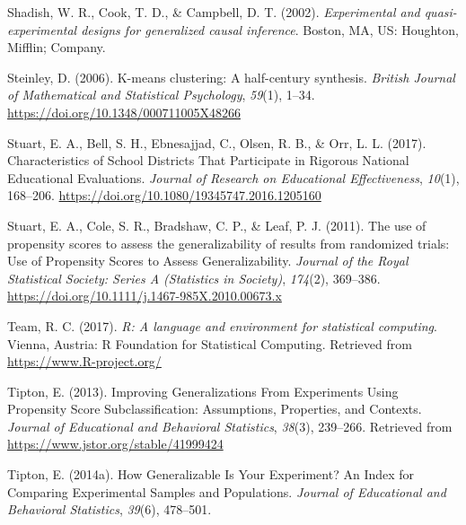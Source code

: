 \documentclass[
  man,floatsintext]{apa6}
\newlength{\cslhangindent}
\newlength{\cslentryspacingunit} %
\newenvironment{CSLReferences}[2] %
 {%
  \setlength{\parindent}{0pt}
  \ifodd #1
  \let\oldpar\par
  \def\par{\hangindent=\cslhangindent\oldpar}
  \fi
  \setlength{\parskip}{#2\cslentryspacingunit}
 }%
 {}
\begin{document}
\begin{CSLReferences}{1}{0}
\leavevmode{}%
Shadish, W. R., Cook, T. D., \& Campbell, D. T. (2002). \emph{Experimental and quasi-experimental designs for generalized causal inference}. Boston, MA, US: Houghton, Mifflin; Company.

\leavevmode{}%
Steinley, D. (2006). K-means clustering: {A} half-century synthesis. \emph{British Journal of Mathematical and Statistical Psychology}, \emph{59}(1), 1--34. \url{https://doi.org/10.1348/000711005X48266}

\leavevmode{}%
Stuart, E. A., Bell, S. H., Ebnesajjad, C., Olsen, R. B., \& Orr, L. L. (2017). Characteristics of {School Districts That Participate} in {Rigorous National Educational Evaluations}. \emph{Journal of Research on Educational Effectiveness}, \emph{10}(1), 168--206. \url{https://doi.org/10.1080/19345747.2016.1205160}

\leavevmode{}%
Stuart, E. A., Cole, S. R., Bradshaw, C. P., \& Leaf, P. J. (2011). The use of propensity scores to assess the generalizability of results from randomized trials: {Use} of {Propensity Scores} to {Assess Generalizability}. \emph{Journal of the Royal Statistical Society: Series A (Statistics in Society)}, \emph{174}(2), 369--386. \url{https://doi.org/10.1111/j.1467-985X.2010.00673.x}

\leavevmode{}%
Team, R. C. (2017). \emph{R: A language and environment for statistical computing}. Vienna, Austria: R Foundation for Statistical Computing. Retrieved from \url{https://www.R-project.org/}

\leavevmode{}%
Tipton, E. (2013). Improving {Generalizations From Experiments Using Propensity Score Subclassification}: {Assumptions}, {Properties}, and {Contexts}. \emph{Journal of Educational and Behavioral Statistics}, \emph{38}(3), 239--266. Retrieved from \url{https://www.jstor.org/stable/41999424}

\leavevmode{}%
Tipton, E. (2014a). How {Generalizable Is Your Experiment}? {An Index} for {Comparing Experimental Samples} and {Populations}. \emph{Journal of Educational and Behavioral Statistics}, \emph{39}(6), 478--501.


\end{CSLReferences}
\end{document}
